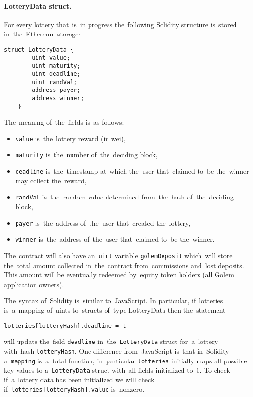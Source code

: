 \documentclass[a4paper]{article}
\begin{document}
    \paragraph{LotteryData struct.}
    For every lottery that~is~in progress the~following Solidity structure is~stored in~the~Ethereum storage:

    \begin{lstlisting}[gobble=4,xleftmargin=1cm]
    struct LotteryData {
        uint value;
        uint maturity;
        uint deadline;
        uint randVal;
        address payer;
        address winner;
    }
    \end{lstlisting}
%
    The~meaning of~the~fields is~as follows:
    \begin{itemize}
        \item \texttt{value} is~the~lottery reward (in wei),
        \item \texttt{maturity} is~the~number of~the~deciding block, %
        \item \texttt{deadline} is~the~timestamp at~which the~user that~claimed to~be the~winner may collect
            the~reward, %
        \item \texttt{randVal} is~the~random value determined from~the~hash of~the~deciding block, %
        \item \texttt{payer} is~the~address of~the~user that~created the~lottery,
        \item \texttt{winner} is~the~address of~the~user that~claimed to~be the~winner.
    \end{itemize}
    The~contract will also have an~\texttt{uint} variable \texttt{golemDeposit} which~will store
    the~total amount collected in~the~contract from~commissions and~lost deposits. This amount will be eventually
    redeemed by~equity token holders (all Golem application owners).

    The~syntax of~Solidity is~similar to~JavaScript. In particular, if~lotteries is~a~mapping of~uints to~structs of~type LotteryData then the~statement
    \begin{center}
      \lstinline!lotteries[lotteryHash].deadline = t!
    \end{center}
    will update the~field \texttt{deadline} in~the~\texttt{LotteryData} struct for~a~lottery with~hash
    \texttt{lotteryHash}. One difference from~JavaScript is~that in~Solidity a~\texttt{mapping} is~a~total
    function, in~particular \texttt{lotteries} initially maps all possible key values to
    a~\texttt{LotteryData} struct with~all fields initialized to~0. To check if~a~lottery data has been initialized
    we will check if~\texttt{lotteries[lotteryHash].value} is~nonzero.
\end{document}
